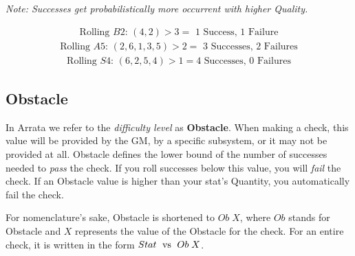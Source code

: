\documentclass[../main.tex]{subfiles}
\begin{document}
    \emph{Note: Successes get probabilistically more occurrent with higher Quality.}
    \\
    \begin{mdframed}[style=Arrata]
        \begin{equation*}
            \begin{gathered}
                \text{Rolling $B2$: } (4,2) > 3 = \text{ 1 Success, 1 Failure}
            \end{gathered}
        \end{equation*}
        \begin{equation*}
            \begin{gathered}
                \text{Rolling $A5$: } (2, 6, 1, 3, 5) > 2 = \text{ 3 Successes, 2 Failures}
            \end{gathered}
        \end{equation*}
        \begin{equation*}
            \begin{gathered}
                \text{Rolling $S4$: } (6, 2, 5, 4) > 1 = \text{4 Successes, 0 Failures}
            \end{gathered}
        \end{equation*}
    \end{mdframed}

    \subsection{Obstacle}

    In Arrata we refer to the {\em difficulty level} as \textbf{Obstacle}. When making a check, this value will be provided by the GM, by a specific subsystem, or it may not be provided at all. Obstacle defines the lower bound of the number of successes needed to {\em pass} the check. If you roll successes below this value, you will {\em fail} the check. If an Obstacle value is higher than your stat's Quantity, you automatically fail the check.

    For nomenclature's sake, Obstacle is shortened to $Ob\; X$, where $Ob$ stands for Obstacle and $X$ represents the value of the Obstacle for the check. For an entire check, it is written in the form $Stat\text{\; vs \;}Ob\; X$.
\end{document}
